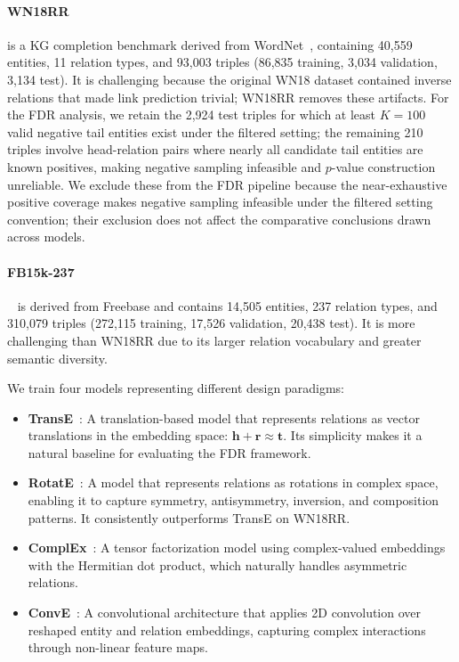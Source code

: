 \paragraph{WN18RR} is a KG completion benchmark derived from WordNet~\cite{dettmers2018convolutional}, containing 40,559 entities, 11 relation types, and 93,003 triples (86,835 training, 3,034 validation, 3,134 test). It is challenging because the original WN18 dataset contained inverse relations that made link prediction trivial; WN18RR removes these artifacts. For the FDR analysis, we retain the 2,924 test triples for which at least $K=100$ valid negative tail entities exist under the filtered setting; the remaining 210 triples involve head-relation pairs where nearly all candidate tail entities are known positives, making negative sampling infeasible and $p$-value construction unreliable. We exclude these from the FDR pipeline because the near-exhaustive positive coverage makes negative sampling infeasible under the filtered setting convention; their exclusion does not affect the comparative conclusions drawn across models.

\paragraph{FB15k-237}~\cite{toutanova2015representing} is derived from Freebase and contains 14,505 entities, 237 relation types, and 310,079 triples (272,115 training, 17,526 validation, 20,438 test). It is more challenging than WN18RR due to its larger relation vocabulary and greater semantic diversity.

We train four models representing different design paradigms:
\begin{itemize}
    \item \textbf{TransE}~\cite{bordes2013translating}: A translation-based model that represents relations as vector translations in the embedding space: $\mathbf{h} + \mathbf{r} \approx \mathbf{t}$. Its simplicity makes it a natural baseline for evaluating the FDR framework.
    \item \textbf{RotatE}~\cite{sun2019rotate}: A model that represents relations as rotations in complex space, enabling it to capture symmetry, antisymmetry, inversion, and composition patterns. It consistently outperforms TransE on WN18RR.
    \item \textbf{ComplEx}~\cite{trouillon2016complex}: A tensor factorization model using complex-valued embeddings with the Hermitian dot product, which naturally handles asymmetric relations.
    \item \textbf{ConvE}~\cite{dettmers2018convolutional}: A convolutional architecture that applies 2D convolution over reshaped entity and relation embeddings, capturing complex interactions through non-linear feature maps.
\end{itemize}


